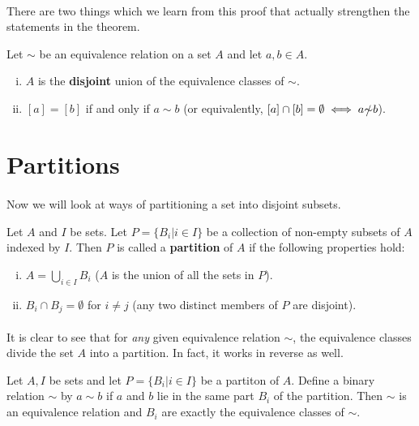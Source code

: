 \documentclass[../abstract_algebra.tex]{subfiles}
\begin{document}
        \paragraph{}
        There are two things which we learn from this proof that actually strengthen the statements in the theorem.
        \begin{corollary}
            Let $\sim$ be an equivalence relation on a set $A$ and let $a,b\in A$.
            \begin{enumerate}[(i)]
                \item $A$ is the \textbf{disjoint} union of the equivalence classes of $\sim$.
                \item $[a]=[b]$ if and only if $a\sim b$ (or equivalently, $[a]\cap[b]=\emptyset\iff a\slashed{\sim}b$).
            \end{enumerate}
        \end{corollary}

    \section{Partitions}
        \paragraph{}
        Now we will look at ways of partitioning a set into disjoint subsets.
        \begin{definition}
            Let $A$ and $I$ be sets. Let $P=\{B_i|i\in I\}$ be a collection of non-empty subsets of $A$ indexed by $I$.
            Then $P$ is called a \textbf{partition} of $A$ if the following properties hold:
            \begin{enumerate}[(i)]
                \item $A=\bigcup_{i\in I}B_i$ ($A$ is the union of all the sets in $P$).
                \item $B_i\cap B_j=\emptyset$ for $i\neq j$ (any two distinct members of $P$ are disjoint).
            \end{enumerate}
        \end{definition}
        
        \paragraph{}
        It is clear to see that for \textit{any} given equivalence relation $\sim$, the equivalence classes divide the set $A$ into a partition.
        In fact, it works in reverse as well.
        \begin{theorem}
            Let $A,I$ be sets and let $P=\{B_i|i\in I\}$ be a partiton of $A$.
            Define a binary relation $\sim$ by $a\sim b$ if $a$ and $b$ lie in the same part $B_i$ of the partition.
            Then $\sim$ is an equivalence relation and $B_i$ are exactly the equivalence classes of $\sim$.
        \end{theorem}
\end{document}
